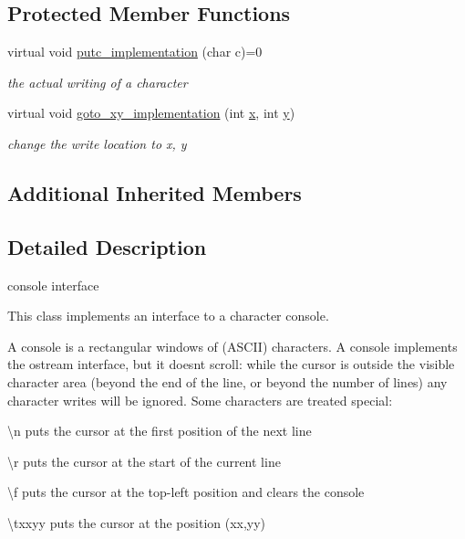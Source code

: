 \subsection*{Protected Member Functions}
\begin{DoxyCompactItemize}
\item 
virtual void \hyperlink{classhwlib_1_1console_aeced637b949acf507d165eace31bc6ce}{putc\+\_\+implementation} (char c)=0
\begin{DoxyCompactList}\small\item\em the actual writing of a character \end{DoxyCompactList}\item 
virtual void \hyperlink{classhwlib_1_1console_a453717af49292f64a0f51b71f3d02812}{goto\+\_\+xy\+\_\+implementation} (int \hyperlink{classhwlib_1_1console_a609d3968c3bce1f52481f8a5b7536b42}{x}, int \hyperlink{classhwlib_1_1console_a809dbf940620fe1ef99725f596bf892a}{y})
\begin{DoxyCompactList}\small\item\em change the write location to x, y \end{DoxyCompactList}\end{DoxyCompactItemize}
\subsection*{Additional Inherited Members}


\subsection{Detailed Description}
console interface 

This class implements an interface to a character console.

A console is a rectangular windows of (A\+S\+C\+II) characters. A console implements the ostream interface, but it doesn\textquotesingle{}t scroll\+: while the cursor is outside the visible character area (beyond the end of the line, or beyond the number of lines) any character writes will be ignored. Some characters are treated special\+:
\begin{DoxyItemize}
\item \textquotesingle{}\textbackslash{}n\textquotesingle{} puts the cursor at the first position of the next line
\item \textquotesingle{}\textbackslash{}r\textquotesingle{} puts the cursor at the start of the current line
\item \textquotesingle{}\textbackslash{}f\textquotesingle{} puts the cursor at the top-\/left position and clears the console
\item \textquotesingle{}\textbackslash{}txxyy\textquotesingle{} puts the cursor at the position (xx,yy)
\end{DoxyItemize}

